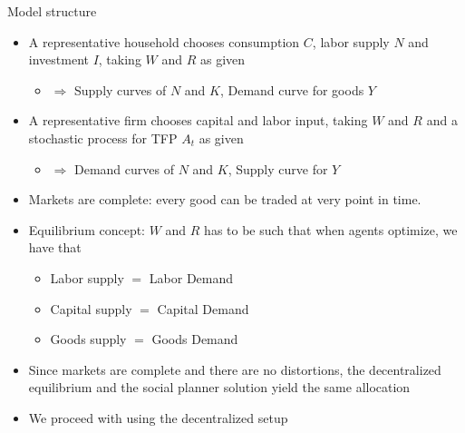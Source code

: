 \documentclass[9pt,xcolor={dvipsnames}]{beamer}
\newcommand{\bit}{\begin{itemize}}
\newcommand{\eit}{\end{itemize}}
\newcommand{\bc}{\color{blue}}
\begin{document}
\begin{frame}{Model structure}

\bit
\setlength\itemsep{1.5em}

\item A representative household chooses consumption $C$, labor supply $N$ and investment $I$, taking $W$ and $R$ as given
\bit
	\item $\Rightarrow$ Supply curves of $N$ and $K$, Demand curve for goods $Y$
\eit

\item A representative firm chooses capital and labor input, taking $W$ and $R$ and {\bc a stochastic process for TFP $A_t$} as given
\bit
	\item $\Rightarrow$ Demand curves of $N$ and $K$, Supply curve for $Y$
\eit

\item {\bc Markets are complete}: every good can be traded at very point in time.

\item Equilibrium concept: $W$ and $R$ has to be such that when agents optimize, we have that
\bit
	\setlength\itemsep{0.5em}
	\item Labor supply $=$ Labor Demand

	\item Capital supply $=$ Capital Demand

	\item Goods supply $=$ Goods Demand
\eit

\item Since markets are complete and there are {\bc no distortions}, the decentralized equilibrium and the social planner solution yield the same allocation

\item We proceed with using the decentralized setup

\eit

\end{frame}
\end{document}
